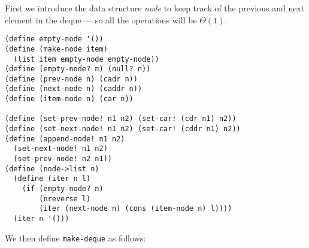 \documentclass[a4paper,12pt]{article}
\begin{document}
First we introduce the data structure \emph{node} to keep track of the
previous and next element in the deque --- so all the operations will
be $\Theta(1)$.
\begin{lstlisting}
(define empty-node '())
(define (make-node item)
  (list item empty-node empty-node))
(define (empty-node? n) (null? n))
(define (prev-node n) (cadr n))
(define (next-node n) (caddr n))
(define (item-node n) (car n))

(define (set-prev-node! n1 n2) (set-car! (cdr n1) n2))
(define (set-next-node! n1 n2) (set-car! (cddr n1) n2))
(define (append-node! n1 n2)
  (set-next-node! n1 n2)
  (set-prev-node! n2 n1))
(define (node->list n)
  (define (iter n l)
    (if (empty-node? n)
        (nreverse l)
        (iter (next-node n) (cons (item-node n) l))))
  (iter n '()))
\end{lstlisting}
We then define \lstinline!make-deque! as follows:
\end{document}
